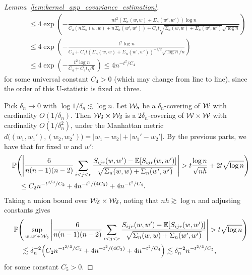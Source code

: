 \begin{proof}[Lemma~\ref{lem:kernel_app_covariance_estimation}]
\begin{align*}
    &\quad\leq
    4 \exp \left(
      - \frac{n t^2 (\Sigma_n(w,w) + \Sigma_n(w',w')) \log n}
      {C_4 (n\Sigma_n(w,w) + n\Sigma_n(w',w'))
      + C_4 t \sqrt{\Sigma_n(w,w) + \Sigma_n(w',w')}\sqrt{\log n}}
    \right) \\
    &\quad\leq
    4 \exp \left(
      - \frac{t^2 \log n}
      {C_4
      + C_4 t (\Sigma_n(w,w) + \Sigma_n(w',w'))^{-1/2} \sqrt{\log n} / n}
    \right) \\
    &\quad\leq
    4 \exp \left(
      - \frac{t^2 \log n}
      {C_4
      + C_4 t \sqrt{h}}
    \right)
    \leq
    4 n^{-t^2 / C_4}
  \end{align*}
  for some universal constant $C_4 > 0$
  (which may change from line to line),
  since the order of this U-statistic is fixed at three.


  Pick $\delta_n \to 0$
  with $\log 1/\delta_n \lesssim \log n$.
  Let $\mathcal{W}_\delta$ be a $\delta_n$-covering of $\mathcal{W}$
  with cardinality $O(1/\delta_n)$.
  Then $\mathcal{W}_\delta \times \mathcal{W}_\delta$
  is a $2\delta_n$-covering of $\mathcal{W} \times \mathcal{W}$
  with cardinality $O(1/\delta_n^2)$,
  under the Manhattan metric
  $d\big((w_1, w_1'), (w_2, w_2')\big)
  = |w_1 - w_2| + |w_1' - w_2'|$.
  By the previous parts,
  we have that for fixed $w$ and $w'$:
  \begin{align*}
    &\mathbb{P}\Bigg(
      \Bigg|
      \frac{6}{n(n-1)(n-2)}
      \sum_{i<j<r}
      \frac{S_{i j r}(w,w') - \mathbb{E}[S_{i j r}(w,w')]}
      {\sqrt{\Sigma_n(w,w) + \Sigma_n(w',w')}}
      \Bigg|
      > t \frac{\log n}{\sqrt{n h}}
      + 2t \sqrt{\log n}
    \Bigg) \\
    &\quad\leq
    C_2 n^{-t^{2/3} / C_2}
    + 4 n^{-t^2 / (4C_3)}
    + 4 n^{-t^2 / C_4}.
  \end{align*}
  Taking a union bound over $\mathcal{W}_\delta \times \mathcal{W}_\delta$,
  noting that $n h \gtrsim \log n$
  and adjusting constants gives
  \begin{align*}
    &\mathbb{P}\Bigg(
      \sup_{w, w' \in \mathcal{W}_\delta}
      \Bigg|
      \frac{6}{n(n-1)(n-2)}
      \sum_{i<j<r}
      \frac{S_{i j r}(w,w') - \mathbb{E}[S_{i j r}(w,w')]}
      {\sqrt{\Sigma_n(w,w) + \Sigma_n(w',w')}}
      \Bigg|
      > t \sqrt{\log n}
    \Bigg) \\
    &\quad\lesssim
    \delta_n^{-2}
    \Big(
      C_2 n^{-t^{2/3} / C_2}
      + 4 n^{-t^2 / (4C_3)}
      + 4 n^{-t^2 / C_4}
    \Big)
    \lesssim
    \delta_n^{-2}
    n^{-t^{2/3} / C_5},
  \end{align*}
  for some constant $C_5 > 0$.


\end{proof}

